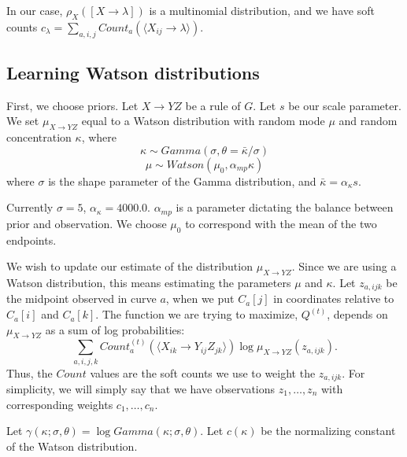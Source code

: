 In our case, $\rho_X([X\to \lambda])$ is a multinomial distribution,
and we have soft counts $c_\lambda = \sum_{a,i,j} Count_a(\langle
X_{ij} \to \lambda \rangle)$.



\subsection{Learning Watson distributions}
  \label{ssec-learning-watson}


First, we choose priors.  Let $X\to YZ$ be a rule of $G$. Let $s$ be
our scale parameter.  We set $\mu_{X\to YZ}$ equal to a Watson
distribution with random mode $\mu$ and random concentration $\kappa$,
where
$$\kappa \sim Gamma(\sigma, \theta=\bar{\kappa}/\sigma)$$
$$\mu \sim Watson(\mu_0, \alpha_{mp} \kappa)$$
where $\sigma$ is the shape parameter of the Gamma distribution, and
$\bar{\kappa} = \alpha_{\kappa} s$. 

Currently $\sigma=5$, $\alpha_\kappa = 4000.0$. $\alpha_{mp}$ is a
parameter dictating the balance between prior and observation.  We
choose $\mu_0$ to correspond with the mean of the two endpoints.


We wish to update our estimate of the distribution $\mu_{X\to
  YZ}$. Since we are using a Watson distribution, this means
estimating the parameters $\mu$ and $\kappa$. Let $z_{a,ijk}$ be
the midpoint observed in curve $a$, when we put $C_a[j]$ in
coordinates relative to $C_a[i]$ and $C_a[k]$. The function we are
trying to maximize, $Q^{(t)}$, depends on $\mu_{X\to YZ}$ as a sum of
log probabilities:
$$\sum_{a,i,j,k} Count_a^{(t)}(\langle X_{ik} \to Y_{ij} Z_{jk}\rangle) \log \mu_{X\to YZ}(z_{a,ijk}).$$
Thus, the $Count$ values are the soft counts we use to weight the
$z_{a,ijk}$. For simplicity, we will simply say that we have
observations $z_1, \dots, z_n$ with corresponding weights $c_1, \dots,
c_n$.

 Let
$\gamma(\kappa;\sigma,\theta) = \log Gamma(\kappa; \sigma,\theta)$.
Let $c(\kappa)$ be the normalizing constant of the Watson
distribution.

